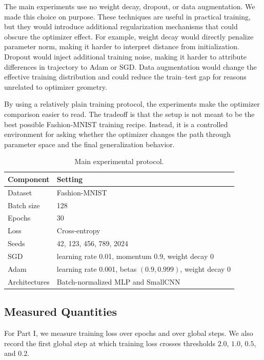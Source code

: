 \documentclass[11pt]{article}
\begin{document}
The main experiments use no weight decay, dropout, or data augmentation. We made this choice on purpose. These techniques are useful in practical training, but they would introduce additional regularization mechanisms that could obscure the optimizer effect. For example, weight decay would directly penalize parameter norm, making it harder to interpret distance from initialization. Dropout would inject additional training noise, making it harder to attribute differences in trajectory to Adam or SGD. Data augmentation would change the effective training distribution and could reduce the train--test gap for reasons unrelated to optimizer geometry.

By using a relatively plain training protocol, the experiments make the optimizer comparison easier to read. The tradeoff is that the setup is not meant to be the best possible Fashion-MNIST training recipe. Instead, it is a controlled environment for asking whether the optimizer changes the path through parameter space and the final generalization behavior.

\begin{table}[H]
\centering
\begin{tabular}{ll}
\toprule
\textbf{Component} & \textbf{Setting}\\
\midrule
Dataset & Fashion-MNIST\\
Batch size & 128\\
Epochs & 30\\
Loss & Cross-entropy\\
Seeds & 42, 123, 456, 789, 2024\\
SGD & learning rate 0.01, momentum 0.9, weight decay 0\\
Adam & learning rate 0.001, betas $(0.9,0.999)$, weight decay 0\\
Architectures & Batch-normalized MLP and SmallCNN\\
\bottomrule
\end{tabular}
\caption{Main experimental protocol.}
\label{tab:setup}
\end{table}

\subsection{Measured Quantities}

For Part I, we measure training loss over epochs and over global steps. We also record the first global step at which training loss crosses thresholds $2.0$, $1.0$, $0.5$, and $0.2$.
\end{document}
